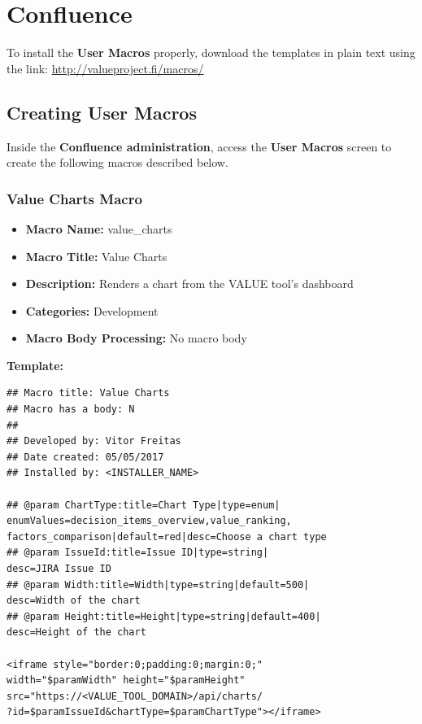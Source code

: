 \documentclass{article}
\begin{document}
\section{Confluence}
\label{confluence}

To install the \textbf{User Macros} properly, download the templates in plain text using the link: \url{http://valueproject.fi/macros/}

\subsection{Creating User Macros}
Inside the \textbf{Confluence administration}, access the \textbf{User Macros} screen to create the following macros described below.

\subsubsection{Value Charts Macro}

\begin{itemize}
    \item \textbf{Macro Name:} value\_charts
    \item \textbf{Macro Title:} Value Charts
    \item \textbf{Description:} Renders a chart from the VALUE tool's dashboard
    \item \textbf{Categories:} Development
    \item \textbf{Macro Body Processing:} No macro body
\end{itemize}

\textbf{Template:}

\begin{lstlisting}[frame=single]
## Macro title: Value Charts
## Macro has a body: N
##
## Developed by: Vitor Freitas
## Date created: 05/05/2017
## Installed by: <INSTALLER_NAME>

## @param ChartType:title=Chart Type|type=enum|
enumValues=decision_items_overview,value_ranking,
factors_comparison|default=red|desc=Choose a chart type
## @param IssueId:title=Issue ID|type=string|
desc=JIRA Issue ID
## @param Width:title=Width|type=string|default=500|
desc=Width of the chart
## @param Height:title=Height|type=string|default=400|
desc=Height of the chart

<iframe style="border:0;padding:0;margin:0;"
width="$paramWidth" height="$paramHeight"
src="https://<VALUE_TOOL_DOMAIN>/api/charts/
?id=$paramIssueId&chartType=$paramChartType"></iframe>
\end{lstlisting}
\end{document}
